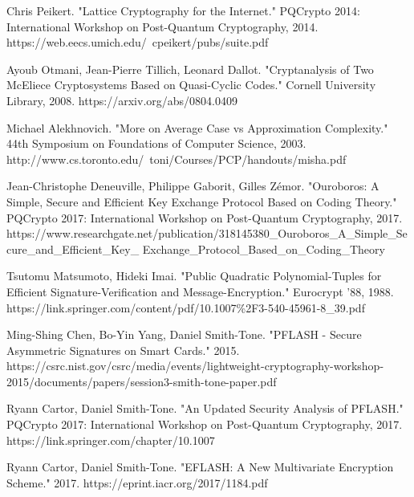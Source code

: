 \documentclass{article}
\begin{document}
\begin{thebibliography}{99}
	Chris Peikert.
	"Lattice Cryptography for the Internet."
	PQCrypto 2014: International Workshop on Post-Quantum Cryptography,
	2014.
	https://web.eecs.umich.edu/~cpeikert/pubs/suite.pdf
	
	Ayoub Otmani, Jean-Pierre Tillich, Leonard Dallot.
	"Cryptanalysis of Two McEliece Cryptosystems Based on Quasi-Cyclic Codes."
	Cornell University Library,
	2008.
	https://arxiv.org/abs/0804.0409
	
	Michael Alekhnovich.
	"More on Average Case vs Approximation Complexity."
	44th Symposium on Foundations of Computer Science,
	2003.
	http://www.cs.toronto.edu/~toni/Courses/PCP/handouts/misha.pdf
	
	Jean-Christophe Deneuville, Philippe Gaborit, Gilles Z\'emor.
	"Ouroboros: A Simple, Secure and Efficient Key Exchange Protocol Based on Coding Theory."
	PQCrypto 2017: International Workshop on Post-Quantum Cryptography,
	2017.
	https://www.researchgate.net/publication/318145380\_Ouroboros\_A\_Simple\_Secure\_and\_Efficient\_Key\_
	Exchange\_Protocol\_Based\_on\_Coding\_Theory
	
	Tsutomu Matsumoto, Hideki Imai.
	"Public Quadratic Polynomial-Tuples for Efficient Signature-Verification and Message-Encryption."
	Eurocrypt '88,
	1988.
	https://link.springer.com/content/pdf/10.1007\%2F3-540-45961-8\_39.pdf
	
	Ming-Shing Chen, Bo-Yin Yang, Daniel Smith-Tone.
	"PFLASH - Secure Asymmetric Signatures on Smart Cards."
	2015.
	https://csrc.nist.gov/csrc/media/events/lightweight-cryptography-workshop-2015/documents/papers/session3-smith-tone-paper.pdf
	
	Ryann Cartor, Daniel Smith-Tone.
	"An Updated Security Analysis of PFLASH."
	PQCrypto 2017: International Workshop on Post-Quantum Cryptography,
	2017.
	https://link.springer.com/chapter/10.1007%
	
	Ryann Cartor, Daniel Smith-Tone.
	"EFLASH: A New Multivariate Encryption Scheme."
	2017.
	https://eprint.iacr.org/2017/1184.pdf

\end{thebibliography}
\end{document}
